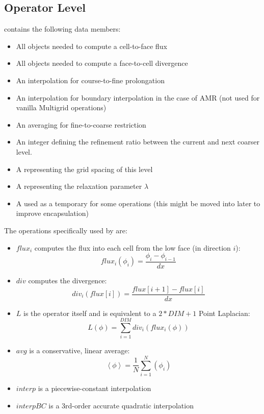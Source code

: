 \documentclass[12pt,a4paper]{article}
\begin{document}
\subsection{Operator Level}
 contains the following data members:
\begin{itemize}
\item All  objects needed to compute a cell-to-face flux
\item All  objects needed to compute a face-to-cell divergence
\item An interpolation  for course-to-fine prolongation
\item An interpolation  for boundary interpolation in the case of AMR (not used for vanilla Multigrid operations)
\item An averaging  for fine-to-coarse restriction
\item An integer defining the refinement ratio between the current and next coarser level. 
\item A  representing the grid spacing of this level
\item A  representing the relaxation parameter $\lambda$
\item A  used as a temporary for some operations (this might be moved into  later to improve encapsulation)
\end{itemize}

The operations specifically used by  are:

\begin{itemize}
\item $flux_i$ computes the flux into each cell from the low face (in direction $i$): $$flux_i(\phi_i) = \frac{\phi_i - \phi_{i-1}}{dx}$$
\item $div$ computes the divergence: $$div_i(flux[i]) = \frac{flux[i+1] - flux[i]}{dx}$$
\item $L$ is the operator itself and is equivalent to a $2*DIM + 1$ Point Laplacian:
$$L(\phi) = \sum_{i=1}^{DIM}div_i(flux_i(\phi))$$
\item $avg$ is a conservative, linear average: $$\left\langle\phi\right\rangle = \frac{1}{N}\sum_{i = 1}^N(\phi_i)$$
\item $interp$ is a  piecewise-constant interpolation
\item $interpBC$ is a 3rd-order accurate quadratic interpolation

\end{itemize}
\end{document}
